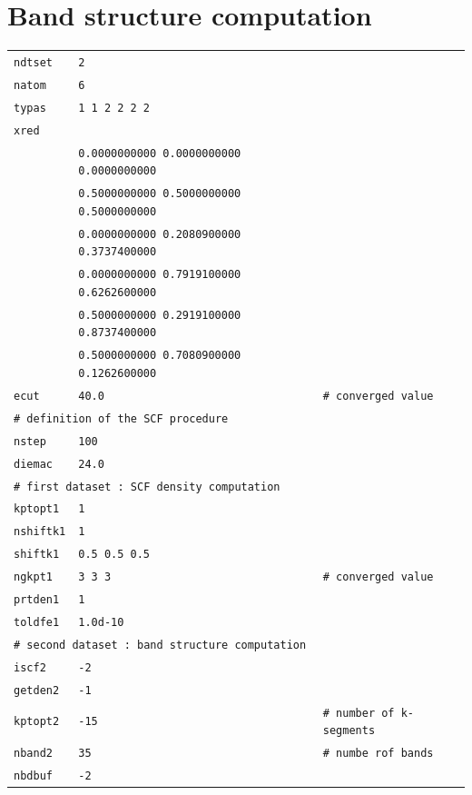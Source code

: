 \documentclass[11pt,a4paper]{article}
\begin{document}
\section{Band structure computation}
\label{Abi6}
\begin{center}
\begin{tabular}{lll}
\texttt{ndtset}&\texttt{2}&\\
\texttt{natom} &\texttt{6}&\\
\texttt{typas} &\texttt{1 1 2 2 2 2}&\\
\texttt{xred} &&\\
&\texttt{0.0000000000    0.0000000000    0.0000000000}&\\
&\texttt{0.5000000000    0.5000000000    0.5000000000}&\\
&\texttt{0.0000000000    0.2080900000    0.3737400000}&\\
&\texttt{0.0000000000    0.7919100000    0.6262600000}&\\
&\texttt{0.5000000000    0.2919100000    0.8737400000}&\\
&\texttt{0.5000000000    0.7080900000    0.1262600000}&\\
\texttt{ecut} &\texttt{40.0}&\texttt{\# converged value}\\
\multicolumn{3}{l}{\texttt{\# definition of the SCF procedure}}\\
\texttt{nstep}&\texttt{100}&\\
\texttt{diemac}&\texttt{24.0}&\\
\multicolumn{3}{l}{\texttt{\# first dataset : SCF density computation}}\\
\texttt{kptopt1}&\texttt{1}&\\
\texttt{nshiftk1}&\texttt{1}&\\
\texttt{shiftk1}&\texttt{0.5 0.5 0.5}&\\
\texttt{ngkpt1}&\texttt{3 3 3}&\texttt{\# converged value}\\
\texttt{prtden1}&\texttt{1}&\\
\texttt{toldfe1}&\texttt{1.0d-10}&\\
\multicolumn{3}{l}{\texttt{\# second dataset : band structure computation}}\\
\texttt{iscf2}&\texttt{-2}&\\
\texttt{getden2}&\texttt{-1}&\\
\texttt{kptopt2}&\texttt{-15}&\texttt{\# number of k-segments}\\
\texttt{nband2}&\texttt{35}&\texttt{\# numbe rof bands}\\
\texttt{nbdbuf}&\texttt{-2}&\\

\end{tabular}
\end{center}
\end{document}
